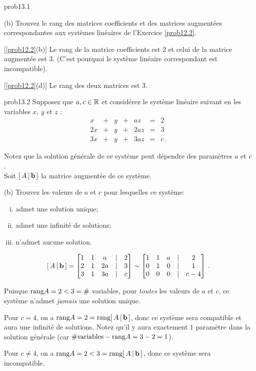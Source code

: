
\begin{sol}{prob13.1} 

 

(b) Trouvez le rang des matrices coefficients et des matrices augmentées correspondantes aux systèmes linéaires de l'Exercice \ref{prob12.2}.

\soln

 [\ref{prob12.2}(b)] Le rang de la matrice coefficients est 2 et celui de la matrice augmentée est 3. (C'est pourquoi le système linéaire correspondant est incompatible).
\medskip

[\ref{prob12.2}(d)] Le rang des deux matrices est 3.

\medskip 
 
\end{sol}

\bigskip
\begin{sol}{prob13.2} Supposez que $a,c\in \mathbb{R}$ et considérez le système linéaire suivant en les variables
$x,\, y$ et $z$ : 
$$\begin{matrix}  x&+&y &+&az&=&2\\
2x&+&y&+&2a z  &=&3\\ 
3x&+&y &+&3az&=&c\,. \end{matrix} $$

Notez que la solution générale de ce système peut dépendre des
paramètres $a$ et $c$. \\
Soit $[\,A\,|\, \mathbf{b}\,]$ la matrice augmentée de ce système.

\medskip 
(b)  Trouvez  les valeurs de
$a$ et $c$ pour lesquelles ce syst\`eme: \smallskip
\begin{enumerate}[(i)]
 
\item admet une solution unique;\smallskip
\item  admet une infinit\'e de solutions;  \smallskip
\item  n'admet aucune solution. 
\end{enumerate}
\soln  

$$[\,A\,|\, \bb\,] =\bmatrix 1&1&a&|&2\\ 2&1&2a&|&3\\ 3&1&3a&|&c\endbmatrix \sim
\bmatrix 1&1&a&|&2\\ 0&1&0&|&1\\ 0&0&0&|&c-4\endbmatrix\,. $$

Puisque $\textrm{rang} A=2<3=\#$ variables, pour {\it toutes} les valeurs de $a$ et $c$, ce système n'admet {\it jamais} une solution unique.
\smallskip

Pour $c=4$, on a $\textrm{rang} A=2=\textrm{rang}[\,A\,|\, \mathbf{b}\,]$, donc ce système sera compatible et aura une infinité de solutions.
Notez qu'il y aura exactement $1$ paramètre dans la solution générale (car $\#\text{variables}-\textrm{rang} A=3-2=1$).
\smallskip

Pour $c\neq 4$, on a $\textrm{rang} A=2<3=\textrm{rang}[\,A\,|\, \mathbf{b}\,]$, donc ce système sera incompatible.
\medskip



\end{sol}



